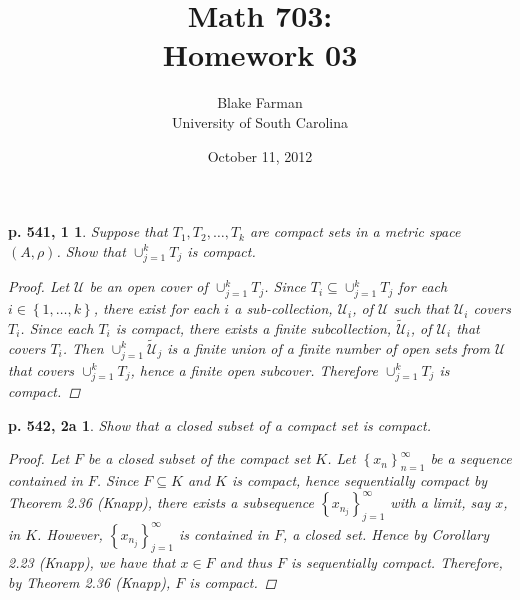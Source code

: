 \documentclass[12pt]{amsart}
\author{Blake Farman\\University of South Carolina}
\title{Math 703:\\Homework 03}
\date{October 11, 2012}
\begin{document}
\maketitle

\providecommand{\norm}[1]{\lVert#1\rVert}
\renewcommand{\qedsymbol}{\ensuremath{\blacksquare}}
\newcommand{\abs}[1]{\left| #1 \right|}
\newcommand{\dist}[2]{\operatorname{dist}\left(#1,#2\right)}

\newtheorem*{ex1}{p. 541, 1}
\newtheorem*{ex2a}{p. 542, 2a}
\newtheorem*{ex3}{p. 542, 3}
\newtheorem*{ex12}{p. 542, 12}
\newtheorem{lem}{Lemma}

\begin{ex1}
  Suppose that $T_1, T_2, \ldots, T_k$ are compact sets in a metric space $(A, \rho)$.
  Show that $\cup_{j=1}^k T_j$ is compact.
  \begin{proof}
    Let $\mathcal{U}$ be an open cover of $\cup_{j=1}^k T_j$.
    Since $T_i \subseteq \cup_{j=1}^k T_j$ for each $i \in \left\{1, \ldots, k\right\}$, there exist for each $i$ a sub-collection, $\mathcal{U}_i$, of $\mathcal{U}$ such that $\mathcal{U}_i$ covers $T_i$.
    Since each $T_i$ is compact, there exists a finite subcollection, $\tilde{\mathcal{U}}_i$, of $\mathcal{U}_i$ that covers $T_i$.
    Then $\cup_{j=1}^k \tilde{\mathcal{U}}_j$ is a finite union of a finite number of open sets from $\mathcal{U}$ that covers $\cup_{j=1}^k T_j$, hence a finite open subcover.
    Therefore $\cup_{j=1}^k T_j$ is compact.
  \end{proof}
\end{ex1}

\begin{ex2a}
  Show that a closed subset of a compact set is compact.
  \begin{proof}
    Let $F$ be a closed subset of the compact set $K$.
    Let $\left\{x_n\right\}_{n=1}^{\infty}$ be a sequence contained in $F$.
    Since $F \subseteq K$ and $K$ is compact, hence sequentially compact by Theorem 2.36 (Knapp), there exists a subsequence $\left\{x_{n_j}\right\}_{j=1}^{\infty}$ with a limit, say $x$, in $K$.
    However, $\left\{x_{n_j}\right\}_{j=1}^{\infty}$ is contained in $F$, a closed set.
    Hence by Corollary 2.23 (Knapp), we have that $x \in F$ and thus $F$ is sequentially compact.
    Therefore, by Theorem 2.36 (Knapp),  $F$ is compact.
  \end{proof}
\end{ex2a}
\end{document}
